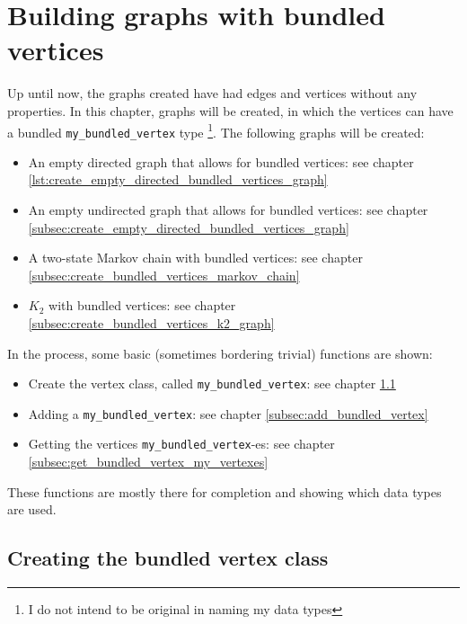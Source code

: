 
\chapter{Building graphs with bundled vertices}
\label{sec:Building-graphs-with-bundled-vertices}

Up until now, the graphs created have had edges and vertices without any
properties.
In this chapter, graphs will be created, in which the vertices can have
a bundled \verb;my_bundled_vertex; type
\footnote{I do not intend to be original in naming my data types}.
The following graphs will be created:

\begin{itemize}
  \item An empty directed graph that allows for bundled vertices: 
    see chapter \ref{lst:create_empty_directed_bundled_vertices_graph}
  \item An empty undirected graph that allows for bundled vertices: 
    see chapter \ref{subsec:create_empty_directed_bundled_vertices_graph}
  \item A two-state Markov chain with bundled vertices: 
    see chapter \ref{subsec:create_bundled_vertices_markov_chain}
  \item $K_{2}$ with bundled vertices: 
    see chapter \ref{subsec:create_bundled_vertices_k2_graph}
\end{itemize}

In the process, some basic (sometimes bordering trivial) functions are shown:

\begin{itemize}
  \item 
    Create the vertex class, called \verb;my_bundled_vertex;: 
    see chapter \ref{subsec:my_bundled_vertex}
  \item Adding a \verb;my_bundled_vertex;: 
    see chapter \ref{subsec:add_bundled_vertex}
  \item Getting the vertices \verb;my_bundled_vertex;-es: 
    see chapter \ref{subsec:get_bundled_vertex_my_vertexes}
\end{itemize}

These functions are mostly there for completion and showing which data types
are used.

\section{Creating the bundled vertex class}
\label{subsec:my_bundled_vertex}

